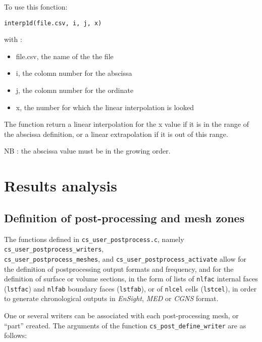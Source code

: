 {{{To use this fonction:

\texttt{interp1d(file.csv, i, j, x)}

with :
\begin{itemize}
\item file.csv, the name of the the file
\item i, the colomn number for the abscissa
\item j, the colomn number for the ordinate
\item x, the number for which the linear interpolation is looked
\end{itemize}
The function return a linear interpolation for the x value
if it is in the range of the abscissa definition, or a
linear extrapolation if it is out of this range.

NB : the abscissa value must be in the growing order.

\section{Results analysis}

\subsection{Definition of post-processing and mesh zones}
\label{prg_definitionpostprocess}
The functions defined in \texttt{cs\_user\_postprocess.c}, namely
\texttt{cs\_user\_postprocess\_writers}, \\ \texttt{cs\_user\_postprocess\_meshes},
and \texttt{cs\_user\_postprocess\_activate} allow for
the definition of postprocessing output formats and frequency, and
for the definition of  surface or volume sections, in the form
of lists of \texttt{nlfac} internal faces (\texttt{lstfac}) and
\texttt{nlfab} boundary faces (\texttt{lstfab}),
or of \texttt{nlcel} cells (\texttt{lstcel}), in order to generate
chronological outputs in {\em EnSight}, {\em MED} or {\em CGNS} format.

One or several writers can be associated with each post-processing
mesh, or ``part'' created. The arguments of the function
\texttt{cs\_post\_define\_writer} are as follows:

}}}

